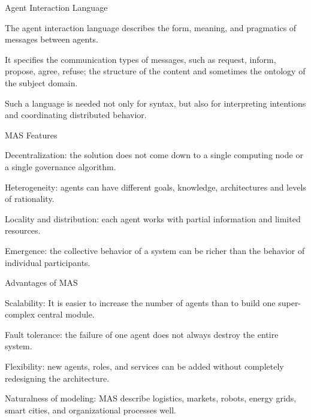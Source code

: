 \begin{frame}{Agent Interaction Language}
	\topline
	\justifying
	\begin{textitemize}
		\item The agent interaction language describes the form, meaning, and pragmatics of messages between agents.
		\item It specifies the communication types of messages, such as request, inform, propose, agree, refuse; the structure of the content and sometimes the ontology of the subject domain.
		\item Such a language is needed not only for syntax, but also for interpreting intentions and coordinating distributed behavior.
	\end{textitemize}
\end{frame}

\begin{frame}{MAS Features}
	\topline
	\justifying
	\begin{textitemize}
		\item Decentralization: the solution does not come down to a single computing node or a single governance algorithm.
		\item Heterogeneity: agents can have different goals, knowledge, architectures and levels of rationality.
		\item Locality and distribution: each agent works with partial information and limited resources.
		\item Emergence: the collective behavior of a system can be richer than the behavior of individual participants.
	\end{textitemize}
\end{frame}

\begin{frame}{Advantages of MAS}
	\topline
	\justifying
	\begin{textitemize}
		\item Scalability: It is easier to increase the number of agents than to build one super-complex central module.
		\item Fault tolerance: the failure of one agent does not always destroy the entire system.
		\item Flexibility: new agents, roles, and services can be added without completely redesigning the architecture.
		\item Naturalness of modeling: MAS describe logistics, markets, robots, energy grids, smart cities, and organizational processes well.
	\end{textitemize}
\end{frame}

